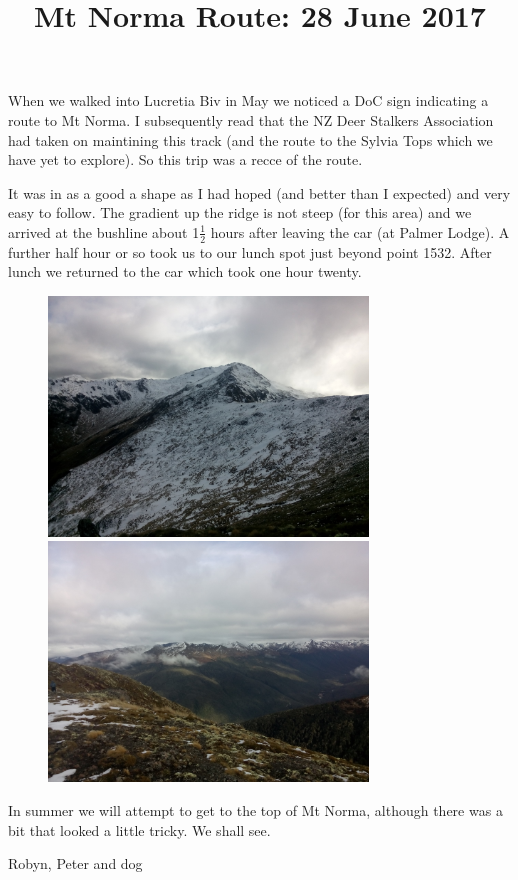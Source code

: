\documentclass[12pt]{article} %
\title{Mt Norma Route: 28 June 2017}
\makeatletter
\renewcommand{\maketitle}{%
  {\bfseries{\scshape{\Large{\@title\par}}}}
}
\makeatother
\begin{document}
  \maketitle

When we walked into Lucretia Biv in May we noticed a DoC sign indicating a route to Mt Norma.  I subsequently read that the NZ Deer Stalkers Association had taken on maintining this track (and the route to the Sylvia Tops which we have yet to explore).  So this trip was a recce of the route.

It was in as a good a shape as I had hoped (and better than I expected) and very easy to follow.  The gradient up the ridge is not steep (for this area) and we arrived at the bushline about 1$\frac{1}{2}$ hours after leaving the car (at Palmer Lodge).  A further half hour or so took us to our lunch spot just beyond point 1532.  After lunch we returned to the car which took one hour twenty.

\begin{figure}[ht]
\begin{minipage}{.5\linewidth}
\begin{flushleft}
   \includegraphics[width=8.5cm]{MtNorma28June2017Photo1}
\end{flushleft}
\end{minipage}
\begin{minipage}{.5\linewidth}
\begin{flushright}
    \includegraphics[width=8.5cm]{MtNorma28June2017Photo2}
\end{flushright}
\end{minipage}
\end{figure}

In summer we will attempt to get to the top of Mt Norma, although there was a bit that looked a little tricky.  We shall see.

\begin{flushright}
Robyn, Peter and dog
\end{flushright}
\end{document}
